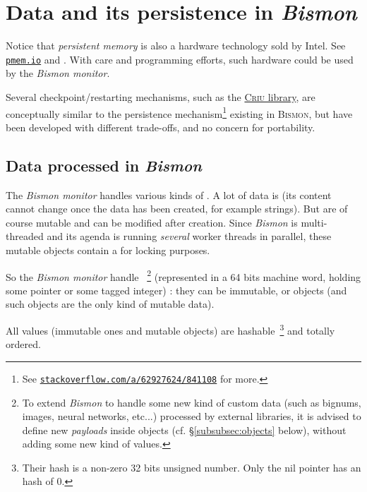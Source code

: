 \section{Data and its persistence in \emph{Bismon}}
\label{sec:datapersist}

Notice that \emph{persistent memory} is also a hardware technology
sold by Intel. See \href{https://pmem.io/}{\texttt{pmem.io}} and
\cite{Scargall:2020:programming}. With care and programming efforts,
such hardware could be used by the \emph{Bismon monitor}.

Several checkpoint/restarting mechanisms, such as the
\href{https://github.com/checkpoint-restore/criu}{\textsc{Criu}
  library}, are conceptually similar to the persistence
mechanism\footnote{See
\href{https://stackoverflow.com/a/62927624/841108}{\texttt{stackoverflow.com/a/62927624/841108}}
for more.} existing in \textsc{Bismon}, but have been developed with
different trade-offs, and no concern for portability.

\subsection{Data processed in \emph{Bismon}}

\label{subsec:dataproc}

The \emph{Bismon monitor} handles various kinds of
. A lot of data is  (its
content cannot change once the data has been created, for example
strings). But  are of course mutable
and can be modified after creation. Since \emph{Bismon} is
multi-threaded and its agenda is running \emph{several} worker threads
in parallel, these mutable objects contain a  for
locking purposes.

So the \emph{Bismon monitor} handle
~\footnote{To extend \emph{Bismon} to
  handle some new kind of custom data (such as bignums, images, neural
  networks, etc...) processed by external libraries, it is advised to
  define new \emph{payloads} inside objects
  (cf. \S\ref{subsubsec:objects} below), without adding some new kind
  of values.} (represented in a 64 bits machine word, holding some
pointer or some tagged integer) : they can be immutable, or objects
(and such objects are the only kind of mutable data).

All values (immutable ones and mutable objects) are
hashable~\footnote{Their hash is a non-zero 32 bits unsigned
  number. Only the nil pointer has an hash of 0.}  and totally
ordered.

